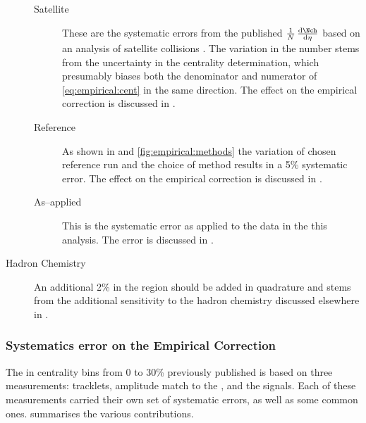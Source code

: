 \begin{description}
\begin{description}
  \item[Satellite] These are the systematic errors from the published
    $\ndndeta$ based on an analysis of satellite collisions
    \cite{Abbas:2013bpa}.  The variation in the number stems from the
    uncertainty in the centrality determination, which presumably
    biases both the denominator and numerator of
    \eqref{eq:empirical:cent} in the same direction. The effect on the
    empirical correction is discussed in . 
  \item[Reference] As shown in  and
    \ref{fig:empirical:methods} the variation of chosen reference run
    and the choice of method results in a 5\% systematic error. The
    effect on the empirical correction is discussed in
    .
  \item[As--applied] This is the systematic error as applied to the
    data in the this analysis. The error is discussed in
    .
  \end{description}
\item[Hadron Chemistry] An additional 2\% in the  region should
  be added in quadrature and stems from the additional sensitivity to
  the hadron chemistry discussed elsewhere in
  .
\end{description}

\subsubsection{Systematics error on the Empirical Correction} 
\label{sec:dndeta:sys:emp}

The \ndndeta{} in centrality bins from 0 to 30\% previously published
\cite{Abbas:2013bpa} is based on three measurements: \SPD{} tracklets,
\VZERO{} amplitude match to the \SPD{}, and the \FMD{} signals.  Each
of these measurements carried their own set of systematic errors, as
well as some common ones.  summarises
the various contributions. 


